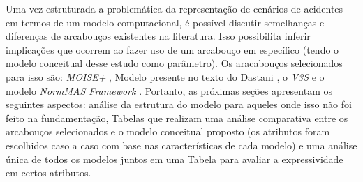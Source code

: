 Uma vez estruturada a problemática da representação de cenários de acidentes em termos de um modelo computacional, é possível discutir semelhanças e diferenças de arcabouços existentes na literatura. Isso possibilita inferir implicações que ocorrem ao fazer uso de um arcabouço em específico (tendo o modelo conceitual desse estudo como parâmetro). Os aracabouços selecionados para isso são: \textit{MOISE+} \cite{moiseframework}, Modelo presente no texto do Dastani \cite{dastaniframework}, o \textit{V3S} \cite{v3sframework} e o modelo \textit{NormMAS Framework} \cite{normas}. Portanto, as próximas seções apresentam os seguintes aspectos: análise da estrutura do modelo para aqueles onde isso não foi feito na fundamentação, Tabelas que realizam uma análise comparativa entre os arcabouços selecionados e o modelo conceitual proposto (os atributos foram escolhidos caso a caso com base nas características de cada modelo) e uma análise única de todos os modelos juntos em uma Tabela para avaliar a expressividade em certos atributos.